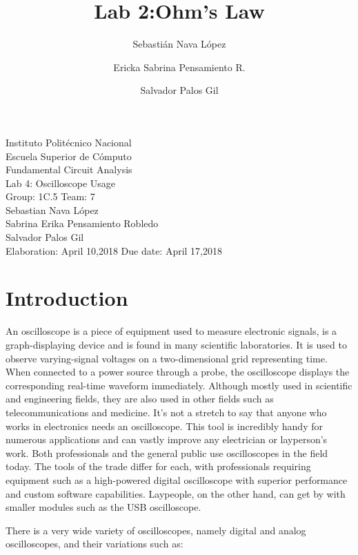 \documentclass[letterpaper]{article}
\title{Lab 2:Ohm's Law}
\author{
    Sebastián Nava López\\
    \and
    Ericka Sabrina Pensamiento R.\\
    \and
    Salvador Palos Gil
}
\begin{document}
\begin{titlepage}
    \centering
    {\Huge Instituto Politécnico Nacional}\\[3ex]
    {\huge Escuela Superior de Cómputo}\\[8ex]
    {\huge Fundamental Circuit Analysis}\\[12ex]
    {\Large Lab 4: Oscilloscope Usage}\\[20ex]
    {\Large Group: 1C.5 Team: 7 \\[8ex]
    Sebastian Nava López\\[4ex]
    Sabrina Erika Pensamiento Robledo\\[4ex]
    Salvador Palos Gil\\[18ex]
    }
    \large{Elaboration: April 10,2018\hspace{8em} Due date: April 17,2018}
\end{titlepage}
\tableofcontents
\newpage
\section{Introduction}
An oscilloscope is a piece of equipment used to measure electronic signals, is a graph-displaying device and is found in many scientific laboratories. It is used to observe varying-signal voltages on a two-dimensional grid representing time. When connected to a power source through a probe, the oscilloscope displays the corresponding real-time waveform immediately. Although mostly used in scientific and engineering fields, they are also used in other fields such as telecommunications and medicine. It’s not a stretch to say that anyone who works in electronics needs an oscilloscope. This tool is incredibly handy for numerous applications and can vastly improve any electrician or layperson’s work. Both professionals and the general public use oscilloscopes in the field today. The tools of the trade differ for each, with professionals requiring equipment such as a high-powered digital oscilloscope with superior performance and custom software capabilities. Laypeople, on the other hand, can get by with smaller modules such as the USB oscilloscope.

There is a very wide variety of oscilloscopes, namely digital and analog oscilloscopes, and their variations such as:
\end{document}
